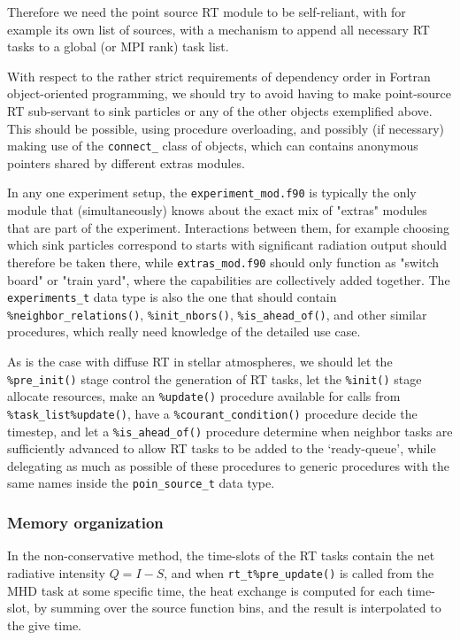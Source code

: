 \documentclass[paper=a4,fontsize=11pt]{scrartcl}
\numberwithin{equation}{section}		%
\numberwithin{figure}{section}			%
\numberwithin{table}{section}				%
\begin{document}
Therefore we need the point source RT module to be self-reliant, with for example its own list of sources, with a mechanism to append all necessary RT tasks to a global (or MPI rank) task list.

With respect to the rather strict requirements of dependency order in Fortran object-oriented programming, we should try to avoid having to make point-source RT sub-servant to sink particles or any of the other objects exemplified above.  This should be possible, using procedure overloading, and possibly (if necessary) making use of the \verb|connect_| class of objects, which can contains anonymous pointers shared by different extras modules.

In any one experiment setup, the \verb|experiment_mod.f90| is typically the only module that (simultaneously) knows about the exact mix of "extras" modules that are part of the experiment.  Interactions between them, for example choosing which sink particles correspond to starts with significant radiation output should therefore be taken there, while \verb|extras_mod.f90| should only function as "switch board" or "train yard", where the capabilities are collectively added together.   The \verb|experiments_t| data type is also the one that should contain \verb|%neighbor_relations()|, \verb|%init_nbors()|, \verb|%is_ahead_of()|, and other similar procedures, which really need knowledge of the detailed use case.

As is the case with diffuse RT in stellar atmospheres, we should let the \verb|%pre_init()| stage control the generation of RT tasks, let the \verb|%init()| stage allocate resources, make an \verb|%update()| procedure available for calls from \verb|%task_list%update()|, have a \verb|%courant_condition()| procedure decide the timestep, and let a \verb|%is_ahead_of()| procedure determine when neighbor tasks are sufficiently advanced to allow RT tasks to be added to the `ready-queue', while delegating as much as possible of these procedures to generic procedures with the same names inside the \verb|poin_source_t| data type. 


\subsubsection{Memory organization}
In the non-conservative method, the time-slots of the RT tasks contain the net radiative intensity $Q=I-S$, and when \verb|rt_t%pre_update()| is called from the MHD task at some specific time, the heat exchange is computed for each time-slot, by summing over the source function bins, and the result is interpolated to the give time.
\end{document}
